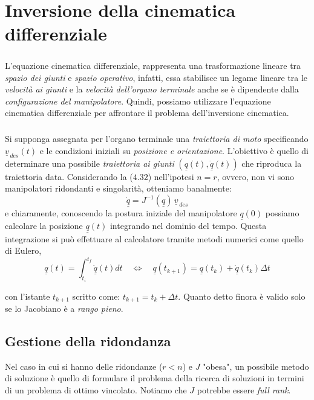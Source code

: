 \chapter{Inversione della cinematica differenziale}
\paragraph{}
L'equazione cinematica differenziale, rappresenta una trasformazione lineare tra \emph{spazio dei giunti} e \emph{spazio operativo}, infatti, essa stabilisce un legame lineare tra le \emph{velocità ai giunti} e la \emph{velocità dell'organo terminale} anche se è dipendente dalla \emph{configurazione del manipolatore}. Quindi, possiamo utilizzare l'equazione cinematica differenziale per affrontare il problema dell'inversione cinematica.  
\paragraph{}
Si supponga assegnata per l'organo terminale una \emph{traiettoria di moto} specificando $\underline{v}_{\,des}(t)$ e le condizioni iniziali su \emph{posizione e orientazione}. L'obiettivo è quello di determinare una possibile \emph{traiettoria ai giunti} $(\underline{q}(t), \underline{\dot{q}}(t))$ che riproduca la traiettoria data. Considerando la ($4.32$) nell'ipotesi $n = r$, ovvero, non vi sono manipolatori ridondanti e singolarità, otteniamo banalmente:
\begin{equation}
	\underline{\dot{q}} = J^{-1}(\underline{q})\,\underline{v}_{\,des}
\end{equation}
e chiaramente, conoscendo la postura iniziale del manipolatore $\underline{q}(0)$ possiamo calcolare la posizione $\underline{q}(t)$ integrando nel dominio del tempo. Questa integrazione si può effettuare al calcolatore tramite metodi numerici come quello di Eulero,
\begin{equation}
	\underline{q}(t) = \int_{t_i}^{t_f} \underline{\dot{q}}(t) dt \quad \Leftrightarrow \quad \underline{q}(t_{k+1}) = \underline{q}(t_k) + \underline{\dot{q}}(t_k)\Delta t 
\end{equation}

con l'istante $t_{k+1}$ scritto come: $t_{k+1} = t_k + \Delta t$. Quanto detto finora è valido solo se lo Jacobiano è a \emph{rango pieno}.

\section{Gestione della ridondanza}
Nel caso in cui si hanno delle ridondanze ($r<n$) e $J$ "obesa", un possibile metodo di soluzione è quello di formulare il problema della ricerca di soluzioni in termini di un problema di ottimo vincolato. Notiamo che $J$ potrebbe essere \emph{full rank}.
